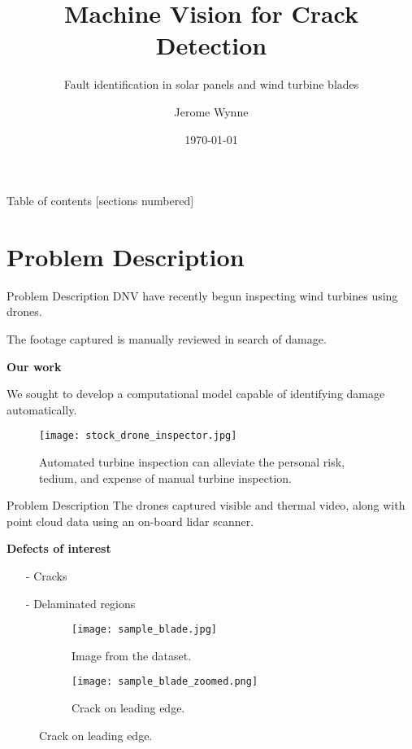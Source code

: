 \documentclass[10pt]{beamer}
\title{Machine Vision for Crack Detection}
\subtitle{Fault identification in solar panels and wind turbine blades}
\date{\today}
\author{Jerome Wynne}
\institute{University of Bristol, DNV-GL}
\begin{document}
\maketitle

\begin{frame}{Table of contents}
  [sections numbered]
  \tableofcontents[hideallsubsections]
\end{frame}

\section{Problem Description}
\begin{frame}[fragile]{Problem Description}
	DNV have recently begun inspecting wind turbines using drones.
	
	 The footage captured is manually reviewed in search of damage.
	
	\textbf{Our work}
	
	We sought to develop a computational model capable of identifying damage automatically.

	\begin{figure}
		\texttt{[image: stock\_drone\_inspector.jpg]}
		\caption{Automated turbine inspection can alleviate the personal risk, tedium, and expense of manual turbine inspection.}
	\end{figure}
	
\end{frame}

\begin{frame}[fragile]{Problem Description}
	The drones captured visible and thermal video, along with point cloud data using an on-board lidar scanner.
	
	\textbf{Defects of interest}
	\begin{itemize}
		\item[-] Cracks
		\item[-] Delaminated regions
	\end{itemize}
	
	\begin{figure}
		\begin{subfigure}[b]{0.35\textwidth}
			\texttt{[image: sample\_blade.jpg]}
			\caption{Image from the dataset.}
		\end{subfigure}
		\qquad
		\begin{subfigure}[b]{0.35\textwidth}
				\texttt{[image: sample\_blade\_zoomed.png]}
			\caption{Crack on leading edge.}
		\end{subfigure}
	\end{figure}
	
\end{frame}
\end{document}
